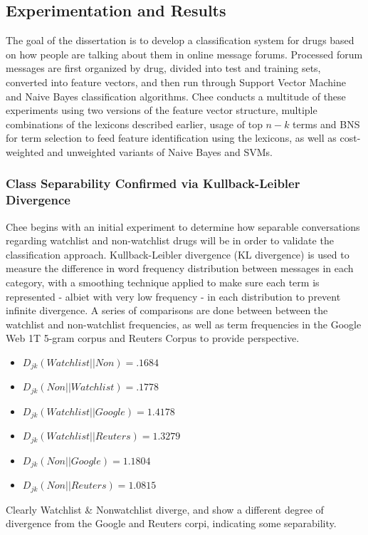 \documentclass[twoside,11pt]{article}
\begin{document}
\subsection{Experimentation and Results}
The goal of the dissertation is to develop a classification system for drugs based on how people are talking about them in online message forums. Processed forum messages are first organized by drug, divided into test and training sets, converted into feature vectors, and then run through Support Vector Machine and Naive Bayes classification algorithms. Chee conducts a multitude of these experiments using two versions of the feature vector structure, multiple combinations of the lexicons described earlier, usage of top $n-k$ terms and BNS for term selection to feed feature identification using the lexicons, as well as cost-weighted and unweighted variants of Naive Bayes and SVMs.

\subsubsection{Class Separability Confirmed via Kullback-Leibler Divergence}
Chee begins with an initial experiment to determine how separable conversations regarding watchlist and non-watchlist drugs will be in order to validate the classification approach. Kullback-Leibler divergence (KL divergence) is used to measure the difference in word frequency distribution between messages in each category, with a smoothing technique applied to make sure each term is represented - albiet with very low frequency - in each distribution to prevent infinite divergence. A series of comparisons are done between between the watchlist and non-watchlist frequencies, as well as term frequencies in the Google Web 1T 5-gram corpus and Reuters Corpus to provide perspective.

\begin{table}
  \caption{}
  \label{}
\end{table}
\begin{itemize}
  \item $D_{jk}(Watchlist || Non) = .1684$
  \item $D_{jk}(Non || Watchlist) = .1778$
  \item $D_{jk}(Watchlist || Google) = 1.4178$
  \item $D_{jk}(Watchlist || Reuters) = 1.3279$
  \item $D_{jk}(Non || Google) = 1.1804$
  \item $D_{jk}(Non || Reuters) = 1.0815$
\end{itemize}
Clearly Watchlist & Nonwatchlist diverge, and show a different degree of divergence from the Google and Reuters corpi, indicating some separability.
\end{document}
